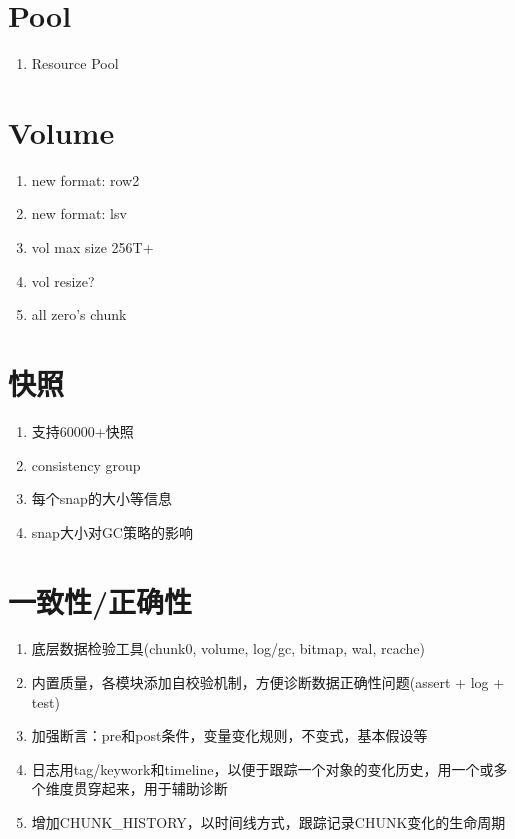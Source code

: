 \section{Pool}

\begin{enumerate}
    \item Resource Pool
\end{enumerate}

\section{Volume}

\begin{enumerate}
    \item new format: row2
    \item new format: lsv
    \item vol max size 256T+
    \item vol resize?
    \item all zero's chunk
\end{enumerate}

\section{快照}

\begin{enumerate}
    \item 支持60000+快照
    \item consistency group
    \item 每个snap的大小等信息
    \item snap大小对GC策略的影响
\end{enumerate}

\section{一致性/正确性}

\begin{tcolorbox}
\begin{enumerate}
    \item 底层数据检验工具(chunk0, volume, log/gc, bitmap, wal, rcache)
    \item 内置质量，各模块添加自校验机制，方便诊断数据正确性问题(assert + log + test)
    \item 加强断言：pre和post条件，变量变化规则，不变式，基本假设等
    \item 日志用tag/keywork和timeline，以便于跟踪一个对象的变化历史，用一个或多个维度贯穿起来，用于辅助诊断
    \item 增加CHUNK\_HISTORY，以时间线方式，跟踪记录CHUNK变化的生命周期
\end{enumerate}
\end{tcolorbox}

